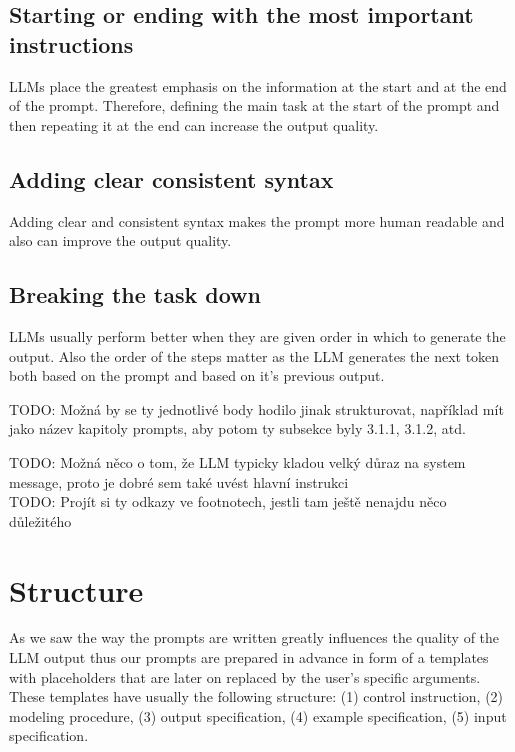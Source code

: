 \subsection{Starting or ending with the most important instructions}
LLMs place the greatest emphasis on the information at the start and at the end of the prompt. Therefore, defining the main task at the start of the prompt and then repeating it at the end can increase the output quality.


\subsection{Adding clear consistent syntax}
Adding clear and consistent syntax makes the prompt more human readable and also can improve the output quality.


\subsection{Breaking the task down}
LLMs usually perform better when they are given order in which to generate the output. Also the order of the steps matter as the LLM generates the next token both based on the prompt and based on it's previous output.



TODO: Možná by se ty jednotlivé body hodilo jinak strukturovat, například mít jako název kapitoly prompts, aby potom ty subsekce byly 3.1.1, 3.1.2, atd.

TODO: Možná něco o tom, že LLM typicky kladou velký důraz na system message, proto je dobré sem také uvést hlavní instrukci \\

TODO: Projít si ty odkazy ve footnotech, jestli tam ještě nenajdu něco důležitého \\


\section{Structure}

As we saw the way the prompts are written greatly influences the quality of the LLM output thus our prompts are prepared in advance in form of a templates with placeholders that are later on replaced by the user's specific arguments. These templates have usually the following structure: (1) control instruction, (2) modeling procedure, (3) output specification, (4) example specification, (5) input specification. \\

